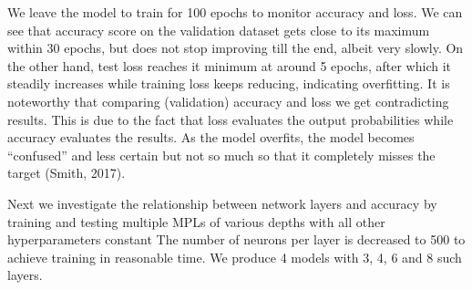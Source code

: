 \documentclass{article}
\begin{document}
We leave the model to train for 100 epochs to monitor accuracy and loss.
We can see that accuracy score on the validation dataset gets close to its maximum within 30 epochs, but does not stop improving till the end, albeit very slowly.
On the other hand, test loss reaches it minimum at around 5 epochs, after which it steadily increases while training loss keeps reducing, indicating overfitting.
It is noteworthy that comparing (validation) accuracy and loss we get contradicting results.
This is due to the fact that loss evaluates the output probabilities while accuracy evaluates the results.
As the model overfits, the model becomes “confused” and less certain but not so much so that it completely misses the target (Smith, 2017).

Next we investigate the relationship between network layers and accuracy by training and testing multiple MPLs of various depths with all other hyperparameters constant
The number of neurons per layer is decreased to 500 to achieve training in reasonable time.
We produce 4 models with 3, 4, 6 and 8 such layers.
\end{document}
